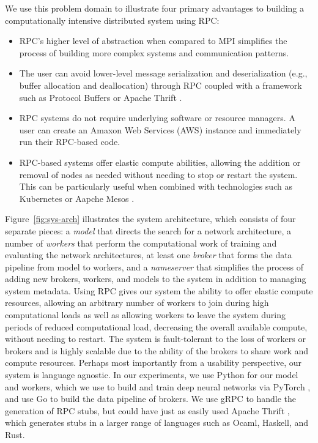 \documentclass[conference]{IEEEtran}
\begin{document}
We use this
problem domain to illustrate four primary advantages to building a
computationally intensive distributed system using RPC:
\begin{itemize}
\item RPC's higher level of abstraction when compared to MPI simplifies the process of
  building more complex systems and communication patterns.
\item The user can avoid lower-level message serialization and deserialization
  (e.g., buffer allocation and deallocation)
  through RPC coupled with a framework such as Protocol Buffers\cite{Varda2008}
  or Apache Thrift \cite{Slee2007}.
\item RPC systems do not require underlying software or resource managers. A
  user can create an Amaxon Web Services (AWS) instance and immediately run their RPC-based code.
\item RPC-based systems offer elastic compute abilities, allowing the addition
  or removal of
  nodes as needed without needing to stop or restart the system. This can be
  particularly useful when combined with technologies such as
  Kubernetes \cite{43826} or Aapche Mesos \cite{Hindman:2011:MPF:1972457.1972488}.
\end{itemize}

Figure~\ref{fig:sys-arch} illustrates the system architecture, which consists of
four separate pieces:
a \emph{model} that directs the
search for a network architecture, a number of \emph{workers} that perform the
computational work of training and evaluating the network architectures, at
least one \emph{broker} that forms the data pipeline from model to workers, and
a \emph{nameserver} that simplifies the process of adding new brokers, workers,
and models to the system in addition to managing system metadata. Using RPC
gives our system the ability to
offer elastic compute resources, allowing an arbitrary number of workers
to join during high computational loads as well as allowing workers to leave the
system during periods of reduced computational load, decreasing the overall
available compute, without needing to restart.  The
system is fault-tolerant to the loss of workers or brokers and is highly
scalable due to the ability of the brokers to share work and compute
resources. Perhaps most importantly from a usability perspective, our system is
language agnostic. In our experiments, we use Python for our model and workers,
which we use to build and train deep neural networks via PyTorch
\cite{paszke2017automatic}, and use Go to build the data pipeline of brokers. We
use gRPC \cite{Wang:1993:GCC:155870.155881} to handle the generation of RPC
stubs, but could have just as easily used Apache Thrift \cite{Slee2007}, which
generates stubs in a larger range of languages such as Ocaml, Haskell, and Rust.
\end{document}
